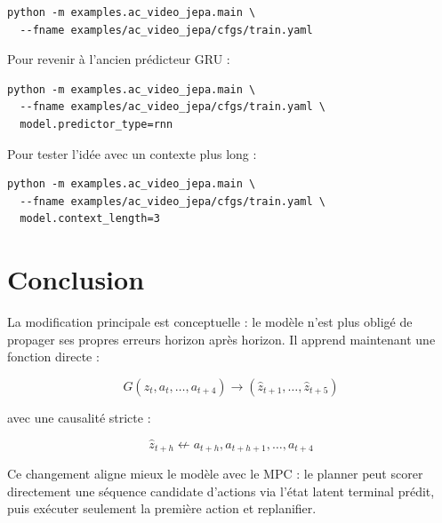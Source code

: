 \documentclass[11pt,a4paper]{article}
\begin{document}
\begin{lstlisting}
python -m examples.ac_video_jepa.main \
  --fname examples/ac_video_jepa/cfgs/train.yaml
\end{lstlisting}

Pour revenir à l'ancien prédicteur GRU :

\begin{lstlisting}
python -m examples.ac_video_jepa.main \
  --fname examples/ac_video_jepa/cfgs/train.yaml \
  model.predictor_type=rnn
\end{lstlisting}

Pour tester l'idée avec un contexte plus long :

\begin{lstlisting}
python -m examples.ac_video_jepa.main \
  --fname examples/ac_video_jepa/cfgs/train.yaml \
  model.context_length=3
\end{lstlisting}

\section{Conclusion}

La modification principale est conceptuelle : le modèle n'est plus obligé de propager
ses propres erreurs horizon après horizon. Il apprend maintenant une fonction directe :

\[
G(z_t, a_t,\dots,a_{t+4})
\rightarrow
(\hat z_{t+1},\dots,\hat z_{t+5})
\]

avec une causalité stricte :

\[
\hat z_{t+h}
\not\leftarrow
a_{t+h}, a_{t+h+1}, \dots, a_{t+4}
\]

Ce changement aligne mieux le modèle avec le MPC : le planner peut scorer directement
une séquence candidate d'actions via l'état latent terminal prédit, puis exécuter seulement
la première action et replanifier.
\end{document}
